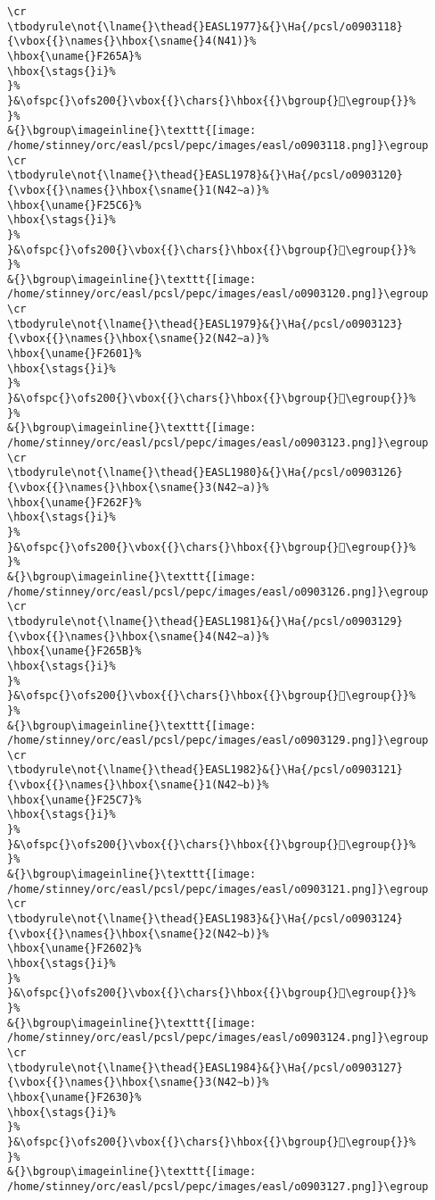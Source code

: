 \begin{verbatim}
\cr
\tbodyrule\not{\lname{}\thead{}EASL1977}&{}\Ha{/pcsl/o0903118}{\vbox{{}\names{}\hbox{\sname{}4(N41)}%
\hbox{\uname{}F265A}%
\hbox{\stags{}i}%
}%
}&\ofspc{}\ofs200{}\vbox{{}\chars{}\hbox{{}\bgroup{}󲙚\egroup{}}%
}%
&{}\bgroup\imageinline{}\texttt{[image: /home/stinney/orc/easl/pcsl/pepc/images/easl/o0903118.png]}\egroup
\cr
\tbodyrule\not{\lname{}\thead{}EASL1978}&{}\Ha{/pcsl/o0903120}{\vbox{{}\names{}\hbox{\sname{}1(N42∼a)}%
\hbox{\uname{}F25C6}%
\hbox{\stags{}i}%
}%
}&\ofspc{}\ofs200{}\vbox{{}\chars{}\hbox{{}\bgroup{}󲗆\egroup{}}%
}%
&{}\bgroup\imageinline{}\texttt{[image: /home/stinney/orc/easl/pcsl/pepc/images/easl/o0903120.png]}\egroup
\cr
\tbodyrule\not{\lname{}\thead{}EASL1979}&{}\Ha{/pcsl/o0903123}{\vbox{{}\names{}\hbox{\sname{}2(N42∼a)}%
\hbox{\uname{}F2601}%
\hbox{\stags{}i}%
}%
}&\ofspc{}\ofs200{}\vbox{{}\chars{}\hbox{{}\bgroup{}󲘁\egroup{}}%
}%
&{}\bgroup\imageinline{}\texttt{[image: /home/stinney/orc/easl/pcsl/pepc/images/easl/o0903123.png]}\egroup
\cr
\tbodyrule\not{\lname{}\thead{}EASL1980}&{}\Ha{/pcsl/o0903126}{\vbox{{}\names{}\hbox{\sname{}3(N42∼a)}%
\hbox{\uname{}F262F}%
\hbox{\stags{}i}%
}%
}&\ofspc{}\ofs200{}\vbox{{}\chars{}\hbox{{}\bgroup{}󲘯\egroup{}}%
}%
&{}\bgroup\imageinline{}\texttt{[image: /home/stinney/orc/easl/pcsl/pepc/images/easl/o0903126.png]}\egroup
\cr
\tbodyrule\not{\lname{}\thead{}EASL1981}&{}\Ha{/pcsl/o0903129}{\vbox{{}\names{}\hbox{\sname{}4(N42∼a)}%
\hbox{\uname{}F265B}%
\hbox{\stags{}i}%
}%
}&\ofspc{}\ofs200{}\vbox{{}\chars{}\hbox{{}\bgroup{}󲙛\egroup{}}%
}%
&{}\bgroup\imageinline{}\texttt{[image: /home/stinney/orc/easl/pcsl/pepc/images/easl/o0903129.png]}\egroup
\cr
\tbodyrule\not{\lname{}\thead{}EASL1982}&{}\Ha{/pcsl/o0903121}{\vbox{{}\names{}\hbox{\sname{}1(N42∼b)}%
\hbox{\uname{}F25C7}%
\hbox{\stags{}i}%
}%
}&\ofspc{}\ofs200{}\vbox{{}\chars{}\hbox{{}\bgroup{}󲗇\egroup{}}%
}%
&{}\bgroup\imageinline{}\texttt{[image: /home/stinney/orc/easl/pcsl/pepc/images/easl/o0903121.png]}\egroup
\cr
\tbodyrule\not{\lname{}\thead{}EASL1983}&{}\Ha{/pcsl/o0903124}{\vbox{{}\names{}\hbox{\sname{}2(N42∼b)}%
\hbox{\uname{}F2602}%
\hbox{\stags{}i}%
}%
}&\ofspc{}\ofs200{}\vbox{{}\chars{}\hbox{{}\bgroup{}󲘂\egroup{}}%
}%
&{}\bgroup\imageinline{}\texttt{[image: /home/stinney/orc/easl/pcsl/pepc/images/easl/o0903124.png]}\egroup
\cr
\tbodyrule\not{\lname{}\thead{}EASL1984}&{}\Ha{/pcsl/o0903127}{\vbox{{}\names{}\hbox{\sname{}3(N42∼b)}%
\hbox{\uname{}F2630}%
\hbox{\stags{}i}%
}%
}&\ofspc{}\ofs200{}\vbox{{}\chars{}\hbox{{}\bgroup{}󲘰\egroup{}}%
}%
&{}\bgroup\imageinline{}\texttt{[image: /home/stinney/orc/easl/pcsl/pepc/images/easl/o0903127.png]}\egroup

\end{verbatim}
